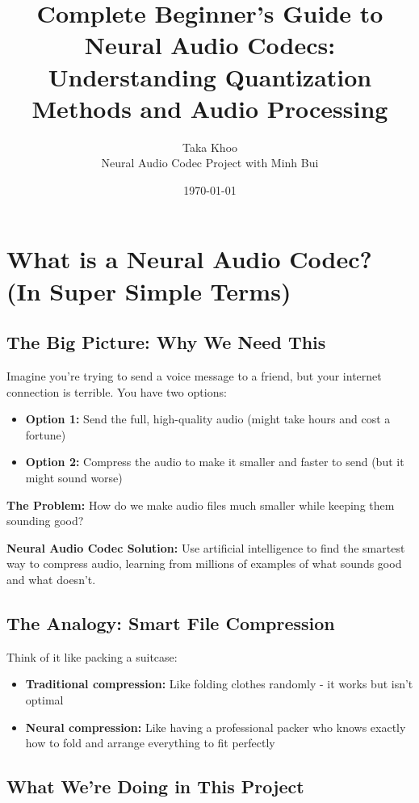 \documentclass[12pt]{article}
\title{\textbf{Complete Beginner's Guide to Neural Audio Codecs: \\ Understanding Quantization Methods and Audio Processing}}
\author{Taka Khoo \\ Neural Audio Codec Project with Minh Bui}
\date{\today}
\begin{document}
\maketitle

\tableofcontents
\newpage

\section{What is a Neural Audio Codec? (In Super Simple Terms)}

\subsection{The Big Picture: Why We Need This}

Imagine you're trying to send a voice message to a friend, but your internet connection is terrible. You have two options:
\begin{itemize}
    \item \textbf{Option 1:} Send the full, high-quality audio (might take hours and cost a fortune)
    \item \textbf{Option 2:} Compress the audio to make it smaller and faster to send (but it might sound worse)
\end{itemize}

\textbf{The Problem:} How do we make audio files much smaller while keeping them sounding good?

\textbf{Neural Audio Codec Solution:} Use artificial intelligence to find the smartest way to compress audio, learning from millions of examples of what sounds good and what doesn't.

\subsection{The Analogy: Smart File Compression}

Think of it like packing a suitcase:
\begin{itemize}
    \item \textbf{Traditional compression:} Like folding clothes randomly - it works but isn't optimal
    \item \textbf{Neural compression:} Like having a professional packer who knows exactly how to fold and arrange everything to fit perfectly
\end{itemize}

\subsection{What We're Doing in This Project}
\end{document}
